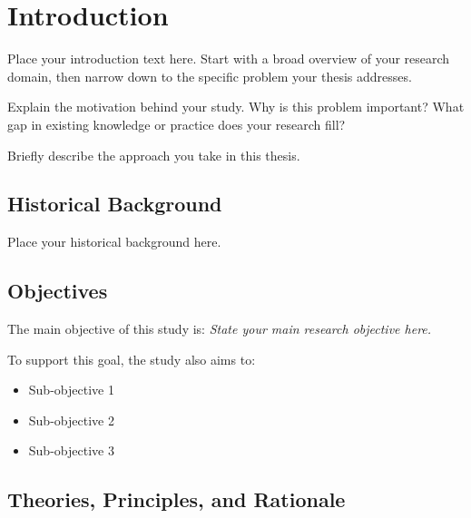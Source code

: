 \chapter{Introduction}



Place your introduction text here. Start with a broad overview of your research domain, then narrow down to the specific problem your thesis addresses.

Explain the motivation behind your study. Why is this problem important? What gap in existing knowledge or practice does your research fill?

Briefly describe the approach you take in this thesis.

\section{Historical Background}


Place your historical background here.

\section{Objectives}

The main objective of this study is:
\textit{State your main research objective here.}

To support this goal, the study also aims to:
\begin{itemize}
    \item Sub-objective 1
    \item Sub-objective 2
    \item Sub-objective 3
\end{itemize}

\section{Theories, Principles, and Rationale}

